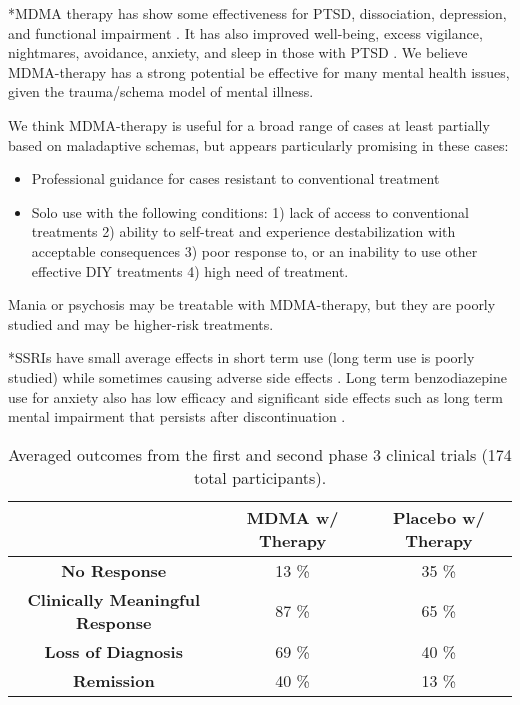 \documentclass[12pt,letterpaper]{article}
\begin{document}
*MDMA therapy has show some effectiveness for PTSD, dissociation, depression, and functional impairment \cite{greenMeta}. It has also improved well-being, excess vigilance, nightmares, avoidance, anxiety, and sleep in those with PTSD \cite{smithSystematic}. We believe MDMA-therapy has a strong potential be effective for many mental health issues, given the trauma/schema model of mental illness. 

We think MDMA-therapy is useful for a broad range of cases at least partially based on maladaptive schemas, but appears particularly promising in these cases:
\begin{itemize}
    \item Professional guidance for cases resistant to conventional treatment
    \item Solo use with the following conditions: 1) lack of access to conventional treatments 2) ability to self-treat and experience destabilization with acceptable consequences 3) poor response to, or an inability to use other effective DIY treatments 4) high need of treatment.
\end{itemize}
Mania or psychosis may be treatable with MDMA-therapy, but they are poorly studied and may be higher-risk treatments.

*SSRIs have small average effects in short term use (long term use is poorly studied) while sometimes causing adverse side effects \cite{ciprianiSSRI,bregginWithdrawal}. Long term benzodiazepine use for anxiety also has low efficacy and significant side effects such as long term mental impairment that persists after discontinuation \cite{shinfukuBenzo,barkerBenzo}.  
\FloatBarrier
\begin{table}[h!]
    \centering
    \caption{Averaged outcomes from the first and second phase 3 clinical trials (174 total participants)\cite{mitchellMDMAClinicalTrial,mitchellMDMAClinicalTrial2}.}
    \label{table:efficacy}
    \begin{tabular}{|c|c|c|}
    \hline
     & \textbf{MDMA w/ Therapy} & \textbf{Placebo w/ Therapy} \\ \hline
    \textbf{No Response}          & 13 \%          & 35 \%          \\ \hline
    \textbf{Clinically Meaningful Response}          & 87 \%          & 65 \%         \\ \hline
    \textbf{Loss of Diagnosis} & 69 \% & 40 \% \\ \hline
    \textbf{Remission}          & 40 \%          & 13 \%          \\ \hline
    \end{tabular}
\end{table}
\FloatBarrier
{}
\end{document}
